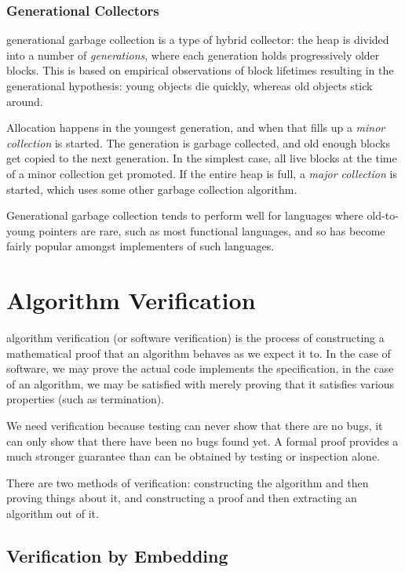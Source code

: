 \subsubsection{Generational Collectors}

\Gls{generational garbage collection} is a type of \gls{hybrid
  collector}: the heap is divided into a number of
\textit{generations}, where each generation holds progressively older
blocks. This is based on empirical observations of block lifetimes
resulting in the generational hypothesis: young objects die quickly,
whereas old objects stick around\cite{Ungar84}.

Allocation happens in the youngest generation, and when that fills up
a \textit{minor collection} is started. The generation is garbage
collected, and old enough blocks get copied to the next generation. In
the simplest case, all live blocks at the time of a minor collection
get promoted. If the entire heap is full, a \textit{major collection}
is started, which uses some other garbage collection
algorithm\cite{GarbageCollection}.

Generational garbage collection tends to perform well for languages
where \glspl{old-to-young pointer} are rare, such as most functional
languages, and so has become fairly popular amongst implementers of
such languages.

\section{Algorithm Verification}

\Gls{algorithm verification} (or software verification) is the process
of constructing a mathematical proof that an algorithm behaves as we
expect it to. In the case of software, we may prove the actual code
implements the specification, in the case of an algorithm, we may be
satisfied with merely proving that it satisfies various properties
(such as termination).

We need verification because testing can never show that there are no
bugs, it can only show that there have been no bugs found yet. A
formal proof provides a much stronger guarantee than can be obtained
by testing or inspection alone.

There are two methods of verification: constructing the algorithm and
then proving things about it, and constructing a proof and then
extracting an algorithm out of it.

\subsection{Verification by Embedding}

